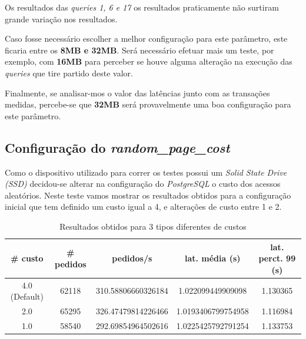 Os resultados das \textit{queries 1, 6 e 17} os resultados praticamente não surtiram grande variação nos resultados.

Caso fosse necessário escolher a melhor configuração para este parâmetro, este ficaria entre os \textbf{8MB e 32MB}. Será necessário efetuar mais um teste, por exemplo, com \textbf{16MB} para perceber se houve alguma alteração na execução das \textit{queries} que tire partido deste valor.

Finalmente, se analisar-mos o valor das latências junto com as transações medidas, percebe-se que \textbf{32MB} será provavelmente uma boa configuração para este parâmetro.


\subsection{Configuração do \textit{random\_page\_cost}}

Como o dispositivo utilizado para correr os testes possui um \textit{Solid State Drive (SSD)} decidou-se alterar na configuração do \textit{PostgreSQL} o custo dos acessos aleatórios. Neste teste vamos mostrar os resultados obtidos para a configuração inicial que tem definido um custo igual a 4, e alterações de custo entre 1 e 2.

\begin{table}[!h]
\center
\small
\begin{tabular}{|c|c|c|c|c|}
\hline
\textbf{\# custo} & \textbf{\# pedidos} & \textbf{pedidos/s} & \textbf{lat. média (s)} & \textbf{lat. perct. 99 (s)}  \\ \hline
4.0 (Default) & 62118 & 310.58806660326184 & 1.022099449909098 & 1.130365  \\ \hline
2.0 & 65295 & 326.47479814226466 & 1.0193406799754958 & 1.116984  \\ \hline
1.0 & 58540 & 292.69854964502616 & 1.0225425792791254 & 1.133753  \\ \hline
\end{tabular}
\caption{Resultados obtidos para 3 tipos diferentes de custos}
\end{table}

